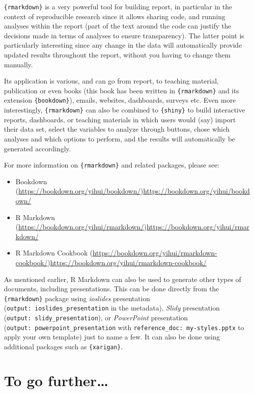 \documentclass[
]{krantz}
\providecommand{\tightlist}{%
  \setlength{\itemsep}{0pt}\setlength{\parskip}{0pt}}
\begin{document}
\texttt{\{rmarkdown\}} is a very powerful tool for building report, in particular in the context of reproducible research since it allows sharing code, and running analyses within the report (part of the text around the code can justify the decisions made in terms of analyses to ensure transparency). The latter point is particularly interesting since any change in the data will automatically provide updated results throughout the report, without you having to change them manually.

Its application is various, and can go from report, to teaching material, publication or even books (this book has been written in \texttt{\{rmarkdown\}} and its extension \texttt{\{bookdown\}}), emails, websites, dashboards, surveys etc. Even more interestingly, \texttt{\{rmarkdown\}} can also be combined to \texttt{\{shiny\}} to build interactive reports, dashboards, or teaching materials in which users would (say) import their data set, select the variables to analyze through buttons, chose which analyses and which options to perform, and the results will automatically be generated accordingly.

For more information on \texttt{\{rmarkdown\}} and related packages, please see:

\begin{itemize}
\tightlist
\item
  Bookdown (\url{https://bookdown.org/yihui/bookdown/})\url{https://bookdown.org/yihui/bookdown/}
\item
  R Markdown (\url{https://bookdown.org/yihui/rmarkdown/})\url{https://bookdown.org/yihui/rmarkdown/}
\item
  R Markdown Cookbook (\url{https://bookdown.org/yihui/rmarkdown-cookbook/})\url{https://bookdown.org/yihui/rmarkdown-cookbook/}
\end{itemize}

As mentioned earlier, R Markdown can also be used to generate other types of documents, including presentations. This can be done directly from the \texttt{\{rmarkdown\}} package using \emph{ioslides} presentation (\texttt{output:\ ioslides\_presentation} in the metadata), \emph{Slidy} presentation (\texttt{output:\ slidy\_presentation}), or \emph{PowerPoint} presentation (\texttt{output:\ powerpoint\_presentation} with \texttt{reference\_doc:\ my-styles.pptx} to apply your own template) just to name a few. It can also be done using additional packages such as \texttt{\{xarigan\}}.

\hypertarget{to-go-further}{%
\section{To go further\ldots{}}\label{to-go-further}}
\end{document}
